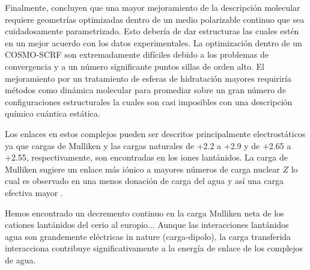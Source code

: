 Finalmente,  concluyen	que una mayor mejoramiento de
la descripci\'on molecular requiere geometr\'ias optimizadas dentro
de un medio polarizable continuo que sea cuidadosamente 
parametrizado.  Esto deber\'ia de dar estructuras las cuales est\'en
en un mejor acuerdo con los datos experimentales. La optimizaci\'on
dentro de un COSMO-SCRF son extremadamente dif\'iciles debido a los
problemas de convergencia y a un n\'umero significante puntos sillas
de orden alto. El mejoramiento por un tratamiento de esferas de 
hidrataci\'on mayores requirir\'ia m\'etodos como din\'amica 
molecular para promediar sobre un gran n\'umero de configuraciones
estructurales la cuales son casi imposibles con una descripci\'on
qu\'imico cu\'antica est\'atica. 

Los enlaces en estos complejos pueden ser descritos principalmente
electrost\'aticos ya que  cargas de Mulliken y las cargas naturales
de +2.2 a +2.9 y de +2.65 a +2.55, respectivamente, son encontradas
en los iones lant\'anidos. La carga de Mulliken sugiere un enlace 
m\'as i\'onico a mayores n\'umeros de carga nuclear $Z$ lo cual es 
observado en una menos donaci\'on de carga del agua y as\'i una carga
efectiva mayor \citep{ciup201001}.

Hemos encontrado un decremento continuo en la carga Mulliken neta de
los cationes lant\'anidos del cerio al europio... Aunque las 
interacciones lant\'anidos agua son grandemente el\'ectricas in 
nature (carga-dipolo), la carga transferida interacciona contribuye
significativamente a la energ\'ia de enlace de los complejos de agua.
